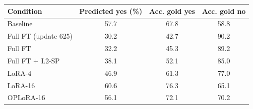 \begin{tabular}{lccc}\toprule Condition & Predicted yes (\%) & Acc. gold yes & Acc. gold no \\ \midrule
Baseline & 57.7 & 67.8 & 58.8 \\
Full FT (update 625) & 30.2 & 42.7 & 90.2 \\
Full FT & 32.2 & 45.3 & 89.2 \\
Full FT + L2-SP & 38.1 & 52.1 & 85.0 \\
LoRA-4 & 46.9 & 61.3 & 77.0 \\
LoRA-16 & 60.6 & 76.3 & 65.1 \\
OPLoRA-16 & 56.1 & 72.1 & 70.2 \\
\bottomrule\end{tabular}
